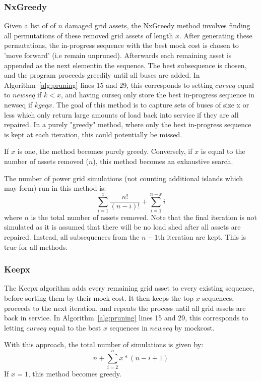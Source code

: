 \documentclass[12pt]{article}
\begin{document}
\subsubsection{NxGreedy}\label{nxgreedy}
Given a list of of $n$ damaged grid assets, the NxGreedy method involves finding all permutations of these removed grid assets of length $x$. After generating these permutations, the in-progress sequence with the best mock cost is chosen to ’move forward’ (i.e remain unpruned). Afterwards each remaining asset is appended as the next elementin the sequence. The best subsequence is chosen, and the program proceeds greedily until all buses are added. In Algorithm~\ref{alg:pruning} lines 15 and 29, this corresponds to setting $curseq$ equal to $newseq$ if $k < x$, and having curseq only store the best in-progress sequence in newseq if $ k geq x$. The goal of this method is to capture sets of buses of size x or less which only return large amounts of load back into service if they are all repaired. In a purely "greedy" method, where only the best in-progress sequence is kept at each iteration, this could potentially be missed. \par
If $x$ is one, the method becomes purely greedy. Conversely, if $x$ is equal to the number of assets removed ($n$), this method becomes an exhaustive search.\par
The number of power grid simulations (not counting additional islands which may form) run in this method is:
\begin{equation} 
    \sum_{i=1}^{x}\frac{n!}{(n-i)!} + \sum_{i=1}^{n-x}i
    \label{eq:NxGreedysims}
\end{equation}
where $n$ is the total number of assets removed. Note that the final iteration is not simulated as it is assumed that there will be no load shed after all assets are repaired. Instead, all subsequences from the $n-1$th iteration are kept. This is true for all methods.
\subsubsection{Keepx}
The Keepx algorithm adds every remaining grid asset to every existing sequence, before sorting them by their mock cost. It then keeps the top $x$ sequences, proceeds to the next iteration, and repeats the process until all grid assets are back in service. In Algorithm~\ref{alg:pruning} lines 15 and 29, this corresponds to letting $curseq$ equal to the best $x$ sequences in $newseq$ by mockcost. \par
With this approach, the total number of simulations is given by:
\begin{equation} 
    n + \sum_{i=2}^{n}x*(n-i+1)
    \label{eq:Keepxsims}
\end{equation}
If $x = 1$, this method becomes greedy.
\end{document}
